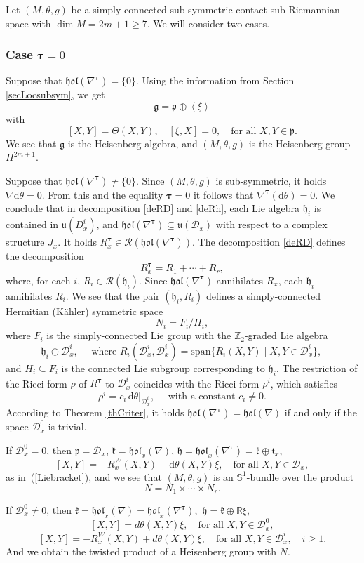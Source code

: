 \documentclass{amsart}
\theoremstyle{plain}
\theoremstyle{definition}
\def\R{\mathcal{R}}
\def\u{\mathfrak{u}}
\def\t{\mathfrak{t}}
\newcommand{\h}{\mathfrak{h}}
\newcommand{\hol}{\mathfrak{hol}}
\newcommand{\bt}{{\boldsymbol{\tau}}}
\newcommand{\Real}{\mathbb{R}}
\newcommand{\1}{\mathbf{1}}
\newcommand{\p}{\mathfrak{p}}
\renewcommand{\k}{\mathfrak{k}}
\newcommand{\g}{\mathfrak{g}}
\newcommand{\D}{{\mathcal D}}
\renewcommand{\d}{\mathrm{d}}
\newcommand{\+}{\oplus}
\begin{document}
Let $(M,\theta,g)$ be a simply-connected sub-symmetric contact sub-Riemannian space with $\dim M=2m+1\geq 7$.
We will consider two cases.

\subsubsection{Case $\bt=0$} Suppose that $\hol(\nabla^\bt)=\{0\}$.  Using the information from Section \ref{secLocsubsym}, we get 
$$\g=\p\oplus\left<\xi\right>$$ with 
$$[X,Y]=\Theta(X,Y),\quad [\xi,X]=0,\quad \text{for all } X,Y\in\p.$$ We see that $\g$ is the Heisenberg algebra, and $(M,\theta,g)$ is the Heisenberg group
 $H^{2m+1}$. 
 
 Suppose that $\hol(\nabla^\bt)\neq \{0\}$.
Since $(M,\theta,g)$ is sub-symmetric, it holds $\nabla\d\theta =0$. From this and the equality $\bt=0$ it follows that $\nabla^\bt(\d\theta)=0$. We conclude that in decomposition \eqref{deRD} and \eqref{deRh}, each Lie algebra $\h_i$ is contained in $\u(D^i_x)$, and $\hol(\nabla^\bt)\subseteq\u(\D_x)$ with respect to a complex structure $J_x$. It holds $R^\bt_x\in\R(\hol(\nabla^\bt))$. The decomposition \eqref{deRD} defines the decomposition
$$R^\bt_x=R_1+\cdots+R_r,$$
where, for each $i$, $R_i\in\R(\h_i)$.
Since $\hol(\nabla^\bt)$ annihilates $R_x$, each $\h_i$ annihilates $R_i$. We see that the pair $(\h_i,R_i)$ defines a simply-connected Hermitian (K\"ahler) symmetric space $$N_i=F_i/H_i,$$
where $F_i$ is the simply-connected Lie group
with the $\mathbb{Z}_2$-graded Lie algebra 
$$\h_i\oplus \D^i_x,\quad \text{ where $R_i(\D^i_x,\D^i_x)=\mathrm{span}\{ R_i(X,Y)\mid X,Y\in \D^i_x\}$, }$$ 
and $H_i\subseteq F_i$ is the connected Lie subgroup corresponding to $\h_i$.  
The restriction  of the Ricci-form  $\rho$ of $R^\bt$ to $\D^i_x$ coincides with the Ricci-form $\rho^i$, which satisfies 
$$\rho^i=c_i \,\d\theta|_{\D^i_x},\quad \text{ with a constant }c_i\neq 0.$$  
According to Theorem \ref{thCriter}, it holds 
$\hol(\nabla^\bt)=\hol(\nabla)$ if and only if the space $\D_x^0$ is trivial. 

If $\D_x^0=0$, then $\p=\D_x$, $\k=\hol_x(\nabla)$, $\h=\hol_x(\nabla^\bt)=\k\oplus\t_x$,
$$[X,Y]=-R^W_x(X,Y)+\d\theta(X,Y)\xi,\quad \text{for all } X,Y\in \D_x,$$
as in~(\ref{Liebracket}), 
and we see that  $(M,\theta,g)$ is an $\mathbb{S}^1$-bundle over 
the product $$N=N_1\times\cdots\times N_r.$$

If $\D_x^0\neq 0$, then $\k=\hol_x(\nabla)=\hol_x(\nabla^\bt),$
$\h=\k\oplus\Real\xi$, 
$$[X,Y]=d\theta(X,Y)\xi,\quad \text{for all } X,Y\in \D^0_x,$$
$$[X,Y]=-R^W_x(X,Y)+d\theta(X,Y)\xi,\quad \text{for all } X,Y\in \D^i_x,\quad i\geq 1.$$
And we obtain the twisted product of a Heisenberg group with $N$.
\end{document}
